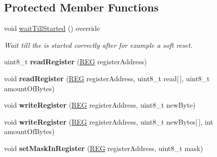 \subsection*{Protected Member Functions}
\begin{DoxyCompactItemize}
\item 
\mbox{\label{class_m_f_r_c522_a6bfefd877c6060dde4eff2c25b7f96f2}} 
void \mbox{\hyperlink{class_m_f_r_c522_a6bfefd877c6060dde4eff2c25b7f96f2}{wait\+Till\+Started}} () override
\begin{DoxyCompactList}\small\item\em Wait till the is started correctly after for example a soft reset. \end{DoxyCompactList}\item 
\mbox{\label{class_m_f_r_c522_afe0e86db047ef36af49349e7fdc7fa65}} 
uint8\+\_\+t {\bfseries read\+Register} (\mbox{\hyperlink{class_m_f_r_c522_ae7ec09eb8c9c61288a4770175b4b8db7}{R\+EG}} register\+Address)
\item 
\mbox{\label{class_m_f_r_c522_a559408e38c2c8fea3316f6e2b4477b81}} 
void {\bfseries read\+Register} (\mbox{\hyperlink{class_m_f_r_c522_ae7ec09eb8c9c61288a4770175b4b8db7}{R\+EG}} register\+Address, uint8\+\_\+t read\mbox{[}$\,$\mbox{]}, uint8\+\_\+t amount\+Of\+Bytes)
\item 
\mbox{\label{class_m_f_r_c522_aa976c78dde5b2dfbbd5bcbedaad14a7a}} 
void {\bfseries write\+Register} (\mbox{\hyperlink{class_m_f_r_c522_ae7ec09eb8c9c61288a4770175b4b8db7}{R\+EG}} register\+Address, uint8\+\_\+t new\+Byte)
\item 
\mbox{\label{class_m_f_r_c522_a3558d379575863072c711721b061bb75}} 
void {\bfseries write\+Register} (\mbox{\hyperlink{class_m_f_r_c522_ae7ec09eb8c9c61288a4770175b4b8db7}{R\+EG}} register\+Address, uint8\+\_\+t new\+Bytes\mbox{[}$\,$\mbox{]}, int amount\+Of\+Bytes)
\item 
\mbox{\label{class_m_f_r_c522_ae30686cdd50f6fdb821908a2547e5153}} 
void {\bfseries set\+Mask\+In\+Register} (\mbox{\hyperlink{class_m_f_r_c522_ae7ec09eb8c9c61288a4770175b4b8db7}{R\+EG}} register\+Address, uint8\+\_\+t mask)
\item 
\mbox{\label{class_m_f_r_c522_a9935264b559702a3a4ad2b87735b4f8f}} 

\end{DoxyCompactItemize}
